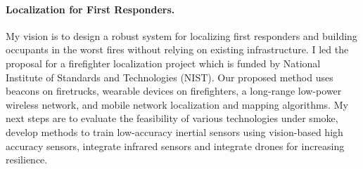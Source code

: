 \documentclass[10pt]{article}
\begin{document}
\paragraph{Localization for First Responders. }
My vision is to design a robust system for localizing first responders and building occupants in the worst fires without relying on existing infrastructure. I led the proposal for a firefighter localization project which is funded by National Institute of Standards and Technologies (NIST).  %
Our proposed method uses beacons on firetrucks, wearable devices on firefighters, a long-range low-power wireless network, and mobile network localization and mapping algorithms. 
My next steps are to evaluate the feasibility of various technologies under smoke, develop methods to train low-accuracy inertial sensors using vision-based high accuracy sensors, integrate infrared sensors and integrate drones for increasing resilience. %

\end{document}
